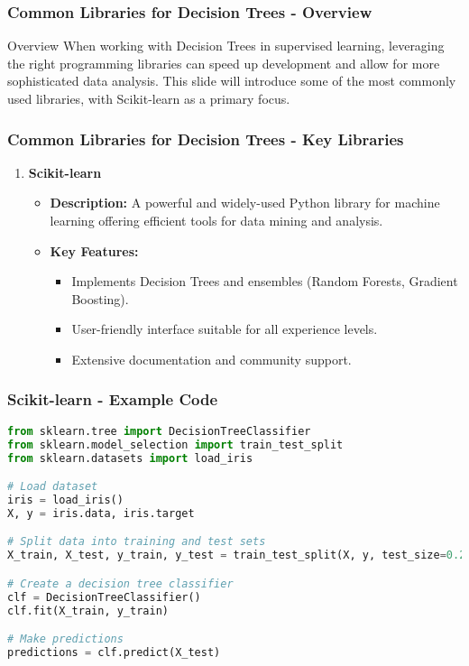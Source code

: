 \documentclass[aspectratio=169]{beamer}
\begin{document}
\begin{frame}
    \frametitle{Common Libraries for Decision Trees - Overview}
    \begin{block}{Overview}
        When working with Decision Trees in supervised learning, leveraging the right programming libraries can speed up development and allow for more sophisticated data analysis. This slide will introduce some of the most commonly used libraries, with Scikit-learn as a primary focus.
    \end{block}
\end{frame}

\begin{frame}[fragile]
    \frametitle{Common Libraries for Decision Trees - Key Libraries}
    \begin{enumerate}
        \item \textbf{Scikit-learn}
        \begin{itemize}
            \item \textbf{Description:} A powerful and widely-used Python library for machine learning offering efficient tools for data mining and analysis.
            \item \textbf{Key Features:}
            \begin{itemize}
                \item Implements Decision Trees and ensembles (Random Forests, Gradient Boosting).
                \item User-friendly interface suitable for all experience levels.
                \item Extensive documentation and community support.
            \end{itemize}
        \end{itemize}
    \end{enumerate}
\end{frame}

\begin{frame}[fragile]
    \frametitle{Scikit-learn - Example Code}
    \begin{lstlisting}[language=Python]
from sklearn.tree import DecisionTreeClassifier
from sklearn.model_selection import train_test_split
from sklearn.datasets import load_iris

# Load dataset
iris = load_iris()
X, y = iris.data, iris.target

# Split data into training and test sets
X_train, X_test, y_train, y_test = train_test_split(X, y, test_size=0.2, random_state=42)

# Create a decision tree classifier
clf = DecisionTreeClassifier()
clf.fit(X_train, y_train)

# Make predictions
predictions = clf.predict(X_test)
    \end{lstlisting}
\end{frame}
\end{document}
